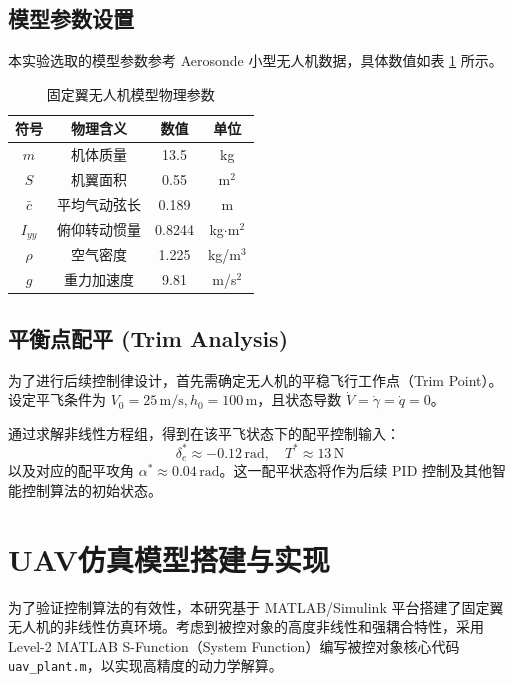 \documentclass[UTF8, a4paper, 12pt]{ctexart}
\begin{document}
\subsection{模型参数设置}
本实验选取的模型参数参考 Aerosonde 小型无人机数据，具体数值如表 \ref{tab:params} 所示。

\begin{table}[H]
    \centering
    \caption{固定翼无人机模型物理参数}
    \label{tab:params}
    \begin{tabular}{cccc}
        \toprule
        \textbf{符号} & \textbf{物理含义} & \textbf{数值} & \textbf{单位} \\
        \midrule
        $m$ & 机体质量 & 13.5 & kg \\
        $S$ & 机翼面积 & 0.55 & m$^2$ \\
        $\bar{c}$ & 平均气动弦长 & 0.189 & m \\
        $I_{yy}$ & 俯仰转动惯量 & 0.8244 & kg$\cdot$m$^2$ \\
        $\rho$ & 空气密度 & 1.225 & kg/m$^3$ \\
        $g$ & 重力加速度 & 9.81 & m/s$^2$ \\
        \bottomrule
    \end{tabular}
\end{table}

\subsection{平衡点配平 (Trim Analysis)}
为了进行后续控制律设计，首先需确定无人机的平稳飞行工作点（Trim Point）。设定平飞条件为 $V_0 = 25\,\text{m/s}, h_0 = 100\,\text{m}$，且状态导数 $\dot{V}=\dot{\gamma}=\dot{q}=0$。

通过求解非线性方程组，得到在该平飞状态下的配平控制输入：
\begin{equation}
    \delta_e^* \approx -0.12\,\text{rad}, \quad T^* \approx 13\,\text{N}
\end{equation}
以及对应的配平攻角 $\alpha^* \approx 0.04\,\text{rad}$。这一配平状态将作为后续 PID 控制及其他智能控制算法的初始状态。
\section{UAV仿真模型搭建与实现}

为了验证控制算法的有效性，本研究基于 MATLAB/Simulink 平台搭建了固定翼无人机的非线性仿真环境。考虑到被控对象的高度非线性和强耦合特性，采用 Level-2 MATLAB S-Function（System Function）编写被控对象核心代码 \texttt{uav\_plant.m}，以实现高精度的动力学解算。
\end{document}

